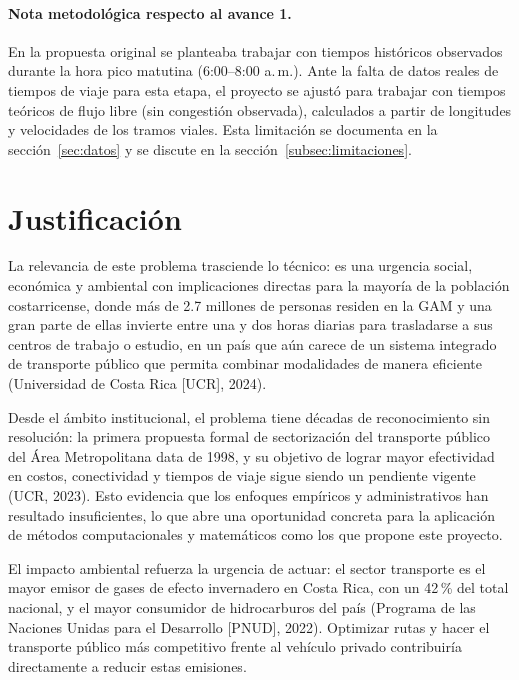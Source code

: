 \documentclass[11pt]{article}
\numberwithin{equation}{section}
\begin{document}
\paragraph{Nota metodológica respecto al avance 1.} En la propuesta original se planteaba trabajar con tiempos históricos observados durante la hora pico matutina (6:00--8:00 a.\,m.). Ante la falta de datos reales de tiempos de viaje para esta etapa, el proyecto se ajustó para trabajar con tiempos teóricos de flujo libre (sin congestión observada), calculados a partir de longitudes y velocidades de los tramos viales. Esta limitación se documenta en la sección~\ref{sec:datos} y se discute en la sección~\ref{subsec:limitaciones}.

\section{Justificación}\label{sec:justificacion}

La relevancia de este problema trasciende lo técnico: es una urgencia social, económica y ambiental con implicaciones directas para la mayoría de la población costarricense, donde más de 2.7 millones de personas residen en la GAM y una gran parte de ellas invierte entre una y dos horas diarias para trasladarse a sus centros de trabajo o estudio, en un país que aún carece de un sistema integrado de transporte público que permita combinar modalidades de manera eficiente (Universidad de Costa Rica [UCR], 2024).

Desde el ámbito institucional, el problema tiene décadas de reconocimiento sin resolución: la primera propuesta formal de sectorización del transporte público del Área Metropolitana data de 1998, y su objetivo de lograr mayor efectividad en costos, conectividad y tiempos de viaje sigue siendo un pendiente vigente (UCR, 2023). Esto evidencia que los enfoques empíricos y administrativos han resultado insuficientes, lo que abre una oportunidad concreta para la aplicación de métodos computacionales y matemáticos como los que propone este proyecto.

El impacto ambiental refuerza la urgencia de actuar: el sector transporte es el mayor emisor de gases de efecto invernadero en Costa Rica, con un 42\,\% del total nacional, y el mayor consumidor de hidrocarburos del país (Programa de las Naciones Unidas para el Desarrollo [PNUD], 2022). Optimizar rutas y hacer el transporte público más competitivo frente al vehículo privado contribuiría directamente a reducir estas emisiones.
\end{document}
